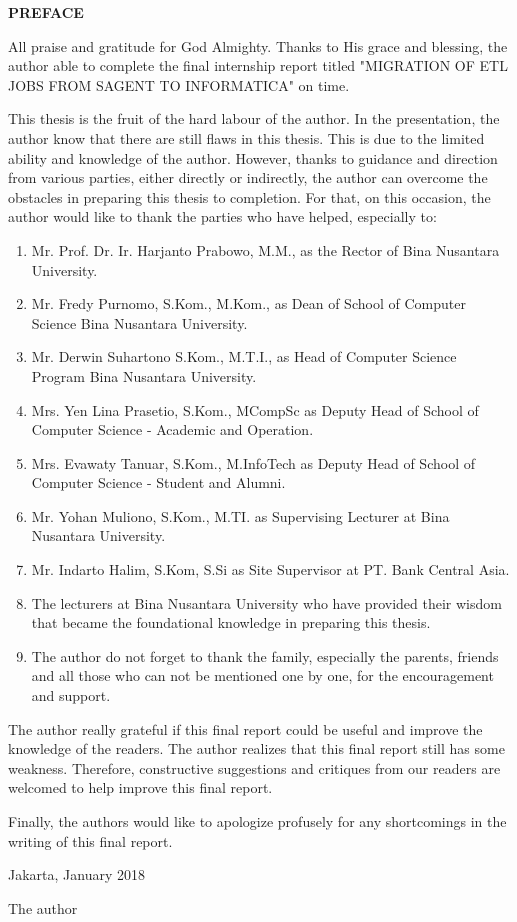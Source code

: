 \renewcommand{\baselinestretch}{1.5}\normalsize

\begingroup
\begin{center}
\fontsize{16pt}{12pt}\selectfont
\textbf{PREFACE}
\end{center}
\endgroup
\justify
\tab All praise and gratitude for God Almighty. Thanks to His grace and blessing, the author able to complete the final internship report titled "MIGRATION OF ETL JOBS FROM SAGENT TO INFORMATICA" on time.

\tab This thesis is the fruit of the hard labour of the author. In the presentation, the author know that there are still flaws in this thesis. This is due to the limited ability and knowledge of the author. However, thanks to guidance and direction from various parties, either directly or indirectly, the author can overcome the obstacles in preparing this thesis to completion. For that, on this occasion, the author would like to thank the parties who have helped, especially to:

\begin{enumerate}
\itemsep0em
\item Mr. Prof. Dr. Ir. Harjanto Prabowo, M.M., as the Rector of Bina Nusantara University.
\item Mr. Fredy Purnomo, S.Kom., M.Kom., as Dean of School of Computer Science Bina Nusantara University.
\item Mr. Derwin Suhartono S.Kom., M.T.I., as Head of Computer Science Program Bina Nusantara University.
\item Mrs. Yen Lina Prasetio, S.Kom., MCompSc as Deputy Head of School of Computer Science - Academic and Operation.
\item Mrs. Evawaty Tanuar, S.Kom., M.InfoTech as Deputy Head of School of Computer Science - Student and Alumni.
\item Mr. Yohan Muliono, S.Kom., M.TI. as Supervising Lecturer at Bina Nusantara University.
\item Mr. Indarto Halim, S.Kom, S.Si as Site Supervisor at PT. Bank Central Asia.
\item The lecturers at Bina Nusantara University who have provided their wisdom that became the foundational knowledge in preparing this thesis.
\item The author do not forget to thank the family, especially the parents, friends and all those who can not be mentioned one by one, for the encouragement and support.
\end{enumerate}

The author really grateful if this final report could be useful and improve the knowledge of the readers. The author realizes that this final report still has some weakness. Therefore, constructive suggestions and critiques from our readers are welcomed to help improve this final report.

Finally, the authors would like to apologize profusely for any shortcomings in the writing of this final report.

\begin{flushright}
Jakarta, January 2018

\vspace{1cm}
The author
\end{flushright}